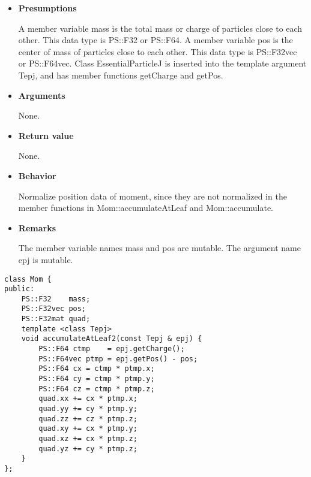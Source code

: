 \begin{itemize}

\item {\bf Presumptions}

  A member variable mass is the total mass or charge of particles
  close to each other. This data type is PS::F32 or PS::F64. A member
  variable pos is the center of mass of particles close to each
  other. This data type is PS::F32vec or PS::F64vec. Class
  EssentialParticleJ is inserted into the template argument Tepj, and
  has member functions getCharge and getPos.

\item {\bf Arguments}

  None.
  
\item {\bf Return value}

  None.

\item {\bf Behavior}

  Normalize position data of moment, since they are not normalized in
  the member functions in Mom::accumulateAtLeaf and Mom::accumulate.
  
\item {\bf Remarks}

  The member variable names mass and pos are mutable. The argument
  name epj is mutable.  

\end{itemize}


\begin{screen}
\begin{verbatim}
class Mom {
public:
    PS::F32    mass;
    PS::F32vec pos;
    PS::F32mat quad;
    template <class Tepj>
    void accumulateAtLeaf2(const Tepj & epj) {
        PS::F64 ctmp    = epj.getCharge();
        PS::F64vec ptmp = epj.getPos() - pos;
        PS::F64 cx = ctmp * ptmp.x;
        PS::F64 cy = ctmp * ptmp.y;
        PS::F64 cz = ctmp * ptmp.z;
        quad.xx += cx * ptmp.x;
        quad.yy += cy * ptmp.y;
        quad.zz += cz * ptmp.z;
        quad.xy += cx * ptmp.y;
        quad.xz += cx * ptmp.z;
        quad.yz += cy * ptmp.z;
    }
};
\end{verbatim}
\end{screen}

